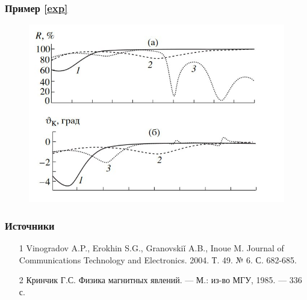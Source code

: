 \documentclass[handout]{beamer}
\begin{document}
\begin{frame}
    \frametitle{Пример \ref{exp}}
    \begin{figure}[h]
        \centering
        \includegraphics[width=1\textwidth]{samp.jpg}
    \end{figure}
\end{frame}

\begin{frame}
    \frametitle{Источники}
    \begin{itemize}
        \item[1] Vinogradov A.P., Erokhin S.G., Granovskiǐ A.B., Inoue M. Journal of Communications Technology and Electronics. 2004. Т. 49. № 6. С. 682-685. \label{exp}
        \item[2] \label{theor} Кринчик Г.С. Физика магнитных явлений. — М.: из-во МГУ, 1985. — 336 с.
    \end{itemize}
    
\end{frame}
\end{document}
